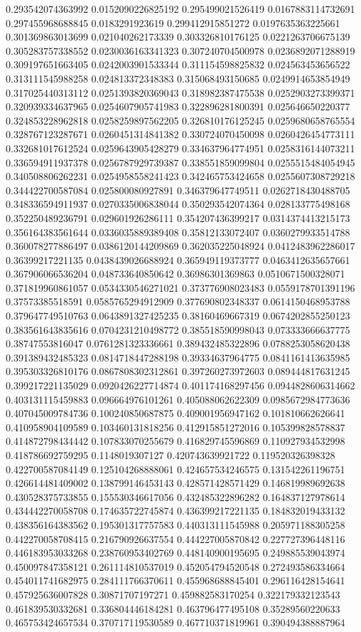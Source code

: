 \begin{table}
\begin{tabu}
\begin{sparkline}{10}
0.293542074363992 0.0152090226825192 0.295499021526419 0.0167883114732691 0.297455968688845 0.0183291923619 0.299412915851272 0.0197635363225661 0.301369863013699 0.021040262173339 0.303326810176125 0.0221263706675139 0.305283757338552 0.0230036163341323 0.307240704500978 0.0236892071288919 0.309197651663405 0.0242003901533344 0.311154598825832 0.024563453656522 0.313111545988258 0.024813372348383 0.315068493150685 0.0249914653854949 0.317025440313112 0.0251393820369043 0.318982387475538 0.0252903273399371 0.320939334637965 0.0254607905741983 0.322896281800391 0.025646650220377 0.324853228962818 0.0258259897562205 0.326810176125245 0.0259680658765554 0.328767123287671 0.0260451314841382 0.330724070450098 0.0260426454773111 0.332681017612524 0.0259643905428279 0.334637964774951 0.0258316144073211 0.336594911937378 0.0256787929739387 0.338551859099804 0.0255515484054945 0.340508806262231 0.0254958558241423 0.342465753424658 0.0255607308729218 0.344422700587084 0.025800080927891 0.346379647749511 0.0262718430488705 0.348336594911937 0.0270335006838044 0.350293542074364 0.028133775498168 0.352250489236791 0.029601926286111 0.354207436399217 0.0314374413215173 0.356164383561644 0.0336035889389408 0.35812133072407 0.0360279933514788 0.360078277886497 0.0386120144209869 0.362035225048924 0.0412483962286017 0.36399217221135 0.0438439026688924 0.365949119373777 0.0463412635657661 0.367906066536204 0.048733640850642 0.36986301369863 0.0510671500328071 0.371819960861057 0.0534330546271021 0.373776908023483 0.0559178701391196 0.37573385518591 0.0585765294912909 0.377690802348337 0.0614150468953788 0.379647749510763 0.0643891327425235 0.38160469667319 0.0674202855250123 0.383561643835616 0.0704231210498772 0.385518590998043 0.073333666637775 0.38747553816047 0.0761281323336661 0.389432485322896 0.0788253058620438 0.391389432485323 0.0814718447288198 0.39334637964775 0.0841161413635985 0.395303326810176 0.0867808302312861 0.397260273972603 0.089444817631245 0.399217221135029 0.0920426227714874 0.401174168297456 0.0944828606314662 0.403131115459883 0.096664976101261 0.405088062622309 0.0985672984773636 0.407045009784736 0.100240850687875 0.409001956947162 0.101810662626641 0.410958904109589 0.103460131818256 0.412915851272016 0.105399828578837 0.414872798434442 0.107833070255679 0.416829745596869 0.110927934532998 0.418786692759295 0.1148019307127 0.420743639921722 0.119520326398328 0.422700587084149 0.125104268888061 0.424657534246575 0.131542261196751 0.426614481409002 0.138799146453143 0.428571428571429 0.146819989692638 0.430528375733855 0.155530346617056 0.432485322896282 0.164837127978614 0.434442270058708 0.174635722745874 0.436399217221135 0.184832019433132 0.438356164383562 0.195301317757583 0.440313111545988 0.205971188305258 0.442270058708415 0.216790926637554 0.444227005870842 0.227727396448116 0.446183953033268 0.238760953402769 0.448140900195695 0.249885539043974 0.450097847358121 0.261114810537019 0.452054794520548 0.272493586334664 0.454011741682975 0.284111766370611 0.455968688845401 0.296116428154641 0.457925636007828 0.30871707197271 0.459882583170254 0.322179332123543 0.461839530332681 0.336804446184281 0.463796477495108 0.35289560220633 0.465753424657534 0.370717119530589 0.467710371819961 0.390494388887964 
\end{sparkline}
\end{tabu}
\end{table}
